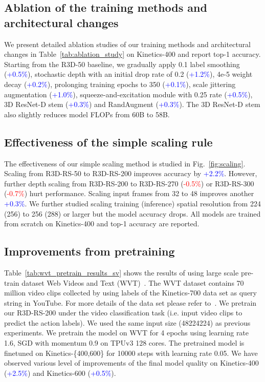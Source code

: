 \documentclass{article} \usepackage{iclr2021_conference,times}
\begin{document}
\subsection{Ablation of the training methods and architectural changes}\label{sec:ablation_exp_1}
We present detailed ablation studies of our training methods and architectural changes in Table~\ref{tab:ablation_study} on Kinetics-400 and report top-1 accuracy. Starting from the R3D-50 baseline, we gradually apply 0.1 label smoothing (\textcolor{blue}{+0.5\%}), stochastic depth with an initial drop rate of 0.2 (\textcolor{blue}{+1.2\%}), 4e-5 weight decay (\textcolor{blue}{+0.2\%}), prolonging training epochs to 350 (\textcolor{blue}{+0.1\%}), scale jittering augmentation (\textcolor{blue}{+1.0\%}), squeeze-and-excitation module with 0.25 rate (\textcolor{blue}{+0.5\%}), 3D ResNet-D stem (\textcolor{blue}{+0.3\%}) and RandAugment (\textcolor{blue}{+0.3\%}). The 3D ResNet-D stem also slightly reduces model FLOPs from 60B to 58B.

\subsection{Effectiveness of the simple scaling rule}\label{sec:ablation_exp_2}
The effectiveness of our simple scaling method is studied in Fig.~\ref{fig:scaling}. Scaling from R3D-RS-50 to R3D-RS-200 improves accuracy by \textcolor{blue}{+2.2\%}. However, further depth scaling from R3D-RS-200 to R3D-RS-270 (\textcolor{red}{-0.5\%}) or R3D-RS-300 (\textcolor{red}{-0.7\%}) hurt performance. Scaling input frames from 32 to 48 improves another \textcolor{blue}{+0.3\%}. We further studied scaling training (inference) spatial resolution from 224 (256) to 256 (288) or larger but the model accuracy drops. All models are trained from scratch on Kinetics-400 and top-1 accuracy are reported.

\subsection{Improvements from pretraining}
Table~\ref{tab:wvt_pretrain_results_sv} shows the results of using large scale pre-train dataset Web Videos and Text (WVT)~\cite{stroud2020learning}.
The WVT dataset contains 70 million video clips collected by using labels of the Kinetics-700 data set as query string in YouTube.
For more details of the data set please refer to~\cite{stroud2020learning}. We pretrain our R3D-RS-200 under the video classification 
task (i.e. input video clips to predict the action labels). We used the same input size (48224224) as previous experiments.
We pretrain the model on WVT for 4 epochs using learning rate 1.6, SGD with momentum 0.9 on TPUv3 128 cores.
The pretrained model is finetuned on Kinetics-\{400,600\} for 10000 steps with learning rate 0.05.
We have observed various level of improvements of the final model quality on Kinetics-400 (\textcolor{blue}{+2.5\%}) and Kinetics-600 (\textcolor{blue}{+0.5\%}).
\end{document}
